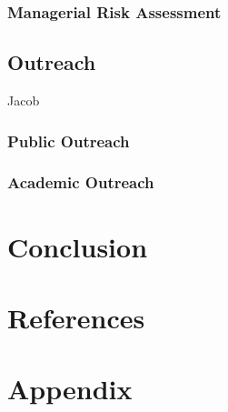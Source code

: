 \documentclass[12pt]{article}
\begin{document}
\subsubsection{Managerial Risk Assessment}

\subsection{Outreach}
Jacob
\subsubsection{Public Outreach}
\subsubsection{Academic Outreach}

\section{Conclusion}

\newpage
\section{References}



\section{Appendix}
\end{document}
